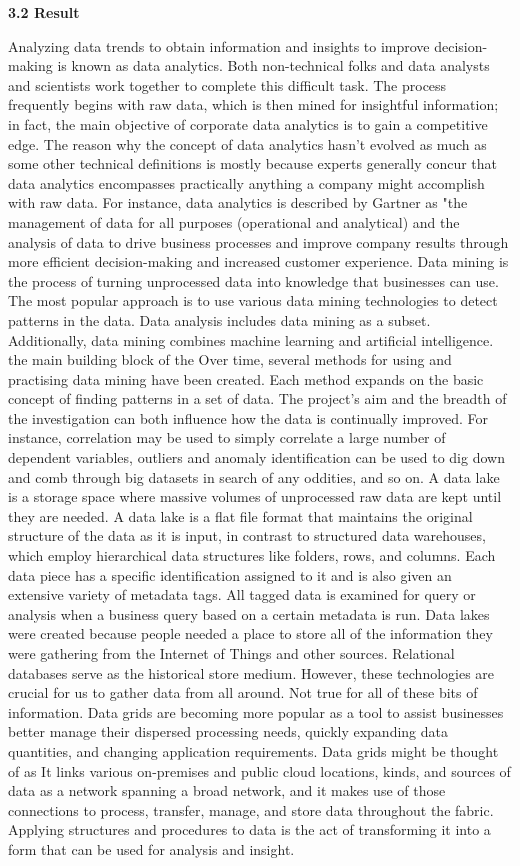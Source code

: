 \documentclass[journal]{IEEEtran}
\begin{document}
\textbf{3.2 Result}
\par Analyzing data trends to obtain information and insights to improve decision-making is known as data analytics. Both non-technical folks and data analysts and scientists work together to complete this difficult task. The process frequently begins with raw data, which is then mined for insightful information; in fact, the main objective of corporate data analytics is to gain a competitive edge.
The reason why the concept of data analytics hasn't evolved as much as some other technical definitions is mostly because experts generally concur that data analytics encompasses practically anything a company might accomplish with raw data. For instance, data analytics is described by Gartner as "the management of data for all purposes (operational and analytical) and the analysis of data to drive business processes and improve company results through more efficient decision-making and increased customer experience. Data mining is the process of turning unprocessed data into knowledge that businesses can use. The most popular approach is to use various data mining technologies to detect patterns in the data. Data analysis includes data mining as a subset. Additionally, data mining combines machine learning and artificial intelligence. the main building block of the Over time, several methods for using and practising data mining have been created. Each method expands on the basic concept of finding patterns in a set of data. The project's aim and the breadth of the investigation can both influence how the data is continually improved. For instance, correlation may be used to simply correlate a large number of dependent variables, outliers and anomaly identification can be used to dig down and comb through big datasets in search of any oddities, and so on. A data lake is a storage space where massive volumes of unprocessed raw data are kept until they are needed. A data lake is a flat file format that maintains the original structure of the data as it is input, in contrast to structured data warehouses, which employ hierarchical data structures like folders, rows, and columns. Each data piece has a specific identification assigned to it and is also given an extensive variety of metadata tags. All tagged data is examined for query or analysis when a business query based on a certain metadata is run. Data lakes were created because people needed a place to store all of the information they were gathering from the Internet of Things and other sources. Relational databases serve as the historical store medium. However, these technologies are crucial for us to gather data from all around. Not true for all of these bits of information. Data grids are becoming more popular as a tool to assist businesses better manage their dispersed processing needs, quickly expanding data quantities, and changing application requirements. Data grids might be thought of as It links various on-premises and public cloud locations, kinds, and sources of data as a network spanning a broad network, and it makes use of those connections to process, transfer, manage, and store data throughout the fabric. Applying structures and procedures to data is the act of transforming it into a form that can be used for analysis and insight. 
\end{document}
